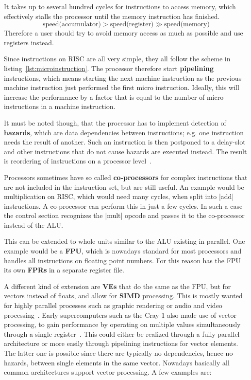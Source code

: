 It takes up to several hundred cycles for instructions to access memory, which effectively stalls the processor until the memory instruction has finished.
\begin{equation*}
    \text{speed(accumulator)} > \text{speed(register)} \gg \text{speed(memory)}
\end{equation*}
Therefore a user should try to avoid memory access as much as possible and use registers instead.

Since instructions on \ac{RISC} are all very simple, they all follow the scheme in listing~\ref{lst:microinstruction}.
The processor therefore start \textbf{pipelining} instructions, which means starting the next machine instruction as the previous machine instruction just performed the first micro instruction.
Ideally, this will increase the performance by a factor that is equal to the number of micro instructions in a machine instruction.

It must be noted though, that the processor has to implement detection of \textbf{hazards}, which are data dependencies between instructions; e.g. one instruction needs the result of another.
Such an instruction is then postponed to a delay-slot and other instructions that do not cause hazards are executed instead.
The result is reordering of instructions on a processor level~\cite[p.~54f]{microprocessor}.

Processors sometimes have so called \textbf{co-processors} for complex instructions that are not included in the instruction set, but are still useful.
An example would be multiplication on \ac{RISC}, which would need many cycles, when split into |add| instructions.
A co-processor can perform this in just a few cycles.
In such a case the control section recognizes the |mult| opcode and passes it to the co-processor instead of the \ac{ALU}.

This can be extended to whole units similar to the \ac{ALU} existing in parallel.
One example would be a \textbf{\ac{FPU}}, which is nowadays standard for most processors and handles all instructions on floating point numbers.
For this reason has the \ac{FPU} its own \textbf{\acp{FPR}} in a separate register file.

A different kind of extension are \textbf{\acfp{VE}} that do the same as the \ac{FPU}, but for vectors instead of floats, and allow for \textbf{\ac{SIMD}} processing.
This is mostly wanted for highly parallel processes such as graphic rendering or audio and video processing~\cite{vectormedia}.
Early supercomputers such as the Cray-1 also made use of vector processing, to gain performance by operating on multiple values  simultaneously through a single register~\cite{supercomputer}.
This could either be realized through a fully parallel architecture or more easily through pipelining instructions for vector elements.
The latter one is possible since there are typically no dependencies, hence no hazards, between single elements in the same vector.
Nowadays basically all common architectures support vector processing.
A few examples are:

